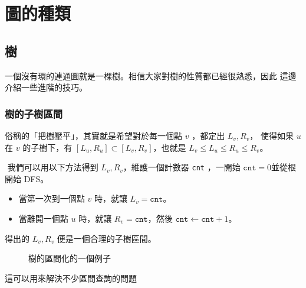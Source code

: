 \documentclass[a4paper,12pt]{book}
\begin{document}
\newcommand{\str}[1]{\texttt{"#1"}}
\newcommand{\mcstr}[2]{\texttt{"#1}\cdots\texttt{#2"}}
\newcommand{\ord}[1]{\opord\left(#1\right)}
\newcommand{\abs}[1]{\lvert #1 \rvert}
\newcommand{\floor}[1]{\lfloor #1 \rfloor}
\newcommand{\ceil}[1]{\lceil #1 \rceil}
\newcommand{\opord}{\operatorname{\mathcal{O}}}
\newcommand{\fail}{\operatorname{\mathcal{F}}}
\newcommand{\flk}{\operatorname{\mathfrak{F}}}
\newcommand{\suf}{\operatorname{\sigma}}
\newcommand{\rank}{\operatorname{\mathcal{R}}}
\newcommand{\sa}{\operatorname{\mathcal{SA}}}
\newcommand{\hei}{\operatorname{\mathcal{H}}}
\newcommand{\edps}{\operatorname{\mathcal{E}}}
\newcommand{\mx}{\operatorname{\mathcal{M}}}
\newcommand{\argmax}{\operatorname{arg\,max}}
\newcommand{\cons}[1]{\left[ \: #1 \: \right]}

\newcommand\numbereqn{\addtocounter{equation}{1}\tag{\theequation}}
\newcommand\listeqn{\hfill\refstepcounter{equation}(\theequation)}
\newenvironment{monobox}{\linespread{0.6}\Verbatim[frame=single, commandchars=\\\{\}]}{\endVerbatim}
\makeatletter


\section{圖的種類}
\subsection{樹}
一個沒有環的連通圖就是一棵樹。相信大家對樹的性質都已經很熟悉，因此
這邊介紹一些進階的技巧。
\begin{figure}[H]
  \centering
  
\end{figure}

\subsubsection{樹的子樹區間}
俗稱的「把樹壓平」，其實就是希望對於每一個點 $v$ ，都定出 $L_v, R_v$，
使得如果 $u$ 在 $v$ 的子樹下，有 $[L_u, R_u] \subset [L_v, R_v]$，也就是
$L_v \leq L_u \leq R_u \leq R_v$。
\begin{theorem}[樹的子樹區間]
  $\texttt{}$ 我們可以用以下方法得到 $L_v, R_v$，維護一個計數器 \texttt{cnt}
  ，一開始 $\texttt{cnt} = 0$並從根開始 DFS。
  \begin{itemize}
      \item 當第一次到一個點 $v$ 時，就讓 $L_v = \texttt{cnt}$。
      \item 當離開一個點 $u$ 時，就讓 $R_v = \texttt{cnt}$，然後 $\texttt{cnt}
          \gets \texttt{cnt} + 1$。
  \end{itemize}
  得出的 $L_v, R_v$ 便是一個合理的子樹區間。
\end{theorem}
\begin{figure}[H]
  \centering
  
  \caption{樹的區間化的一個例子}
\end{figure}
這可以用來解決不少區間查詢的問題
\end{document}
